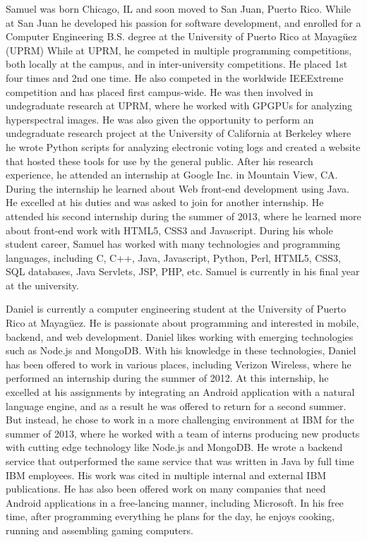 Samuel was born Chicago, IL and soon moved to San Juan, Puerto Rico. While at
San Juan he developed his passion for software development, and enrolled for a
Computer Engineering B.S. degree at the University of Puerto Rico at Mayagüez
(UPRM) While at UPRM, he competed in multiple programming competitions, both
locally at the campus, and in inter-university competitions. He placed 1st four
times and 2nd one time. He also competed in the worldwide IEEExtreme competition
and has placed first campus-wide. He was then involved in undegraduate research
at UPRM, where he worked with GPGPUs for analyzing hyperspectral images. He was
also given the opportunity to perform an undegraduate research project at the
University of California at Berkeley where he wrote Python scripts for analyzing
electronic voting logs and created a website that hosted these tools for use by
the general public. After his research experience, he attended an internship at
Google Inc. in Mountain View, CA. During the internship he learned about Web
front-end development using Java. He excelled at his duties and was asked to
join for another internship. He attended his second internship during the summer
of 2013, where he learned more about front-end work with HTML5, CSS3 and
Javascript. During his whole student career, Samuel has worked with many
technologies and programming languages, including C, C++, Java, Javascript,
Python, Perl, HTML5, CSS3, SQL databases, Java Servlets, JSP, PHP, etc. Samuel
is currently in his final year at the university.


Daniel is currently a computer engineering student at the University of
Puerto Rico at Mayagüez. He is passionate about programming and interested in
mobile, backend, and web development. Daniel likes working with emerging
technologies such as Node.js and MongoDB. With his knowledge in these
technologies, Daniel has been offered to work in various places, including
Verizon Wireless, where he performed an internship during the summer of 2012. At
this internship, he excelled at his assignments by integrating an Android
application with a natural language engine, and as a result he was offered to
return for a second summer. But instead, he chose to work in a more challenging
environment at IBM for the summer of 2013, where he worked with a team of
interns producing new products with cutting edge technology like Node.js and
MongoDB. He wrote a backend service that outperformed the same service that was
written in Java by full time IBM employees. His work was cited in multiple
internal and external IBM publications. He has also been offered work on many
companies that need Android applications in a free-lancing manner, including
Microsoft. In his free time, after programming everything he plans for the day,
he enjoys cooking, running and assembling gaming computers.